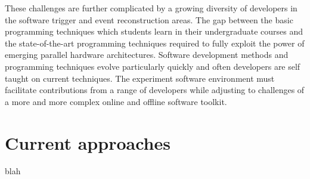 These challenges are further complicated by a growing diversity of developers in the software trigger and event reconstruction areas. The gap between the basic programming techniques which students learn in their undergraduate courses and the state-of-the-art programming techniques required to fully exploit the power of emerging parallel hardware architectures. Software development methods and programming techniques evolve particularly quickly and often developers are self taught on current techniques. The experiment software environment must facilitate contributions from a range of developers while adjusting to challenges of a more and more complex online and offline software toolkit.

\section{Current approaches}



blah~\cite{HSFWEB}
